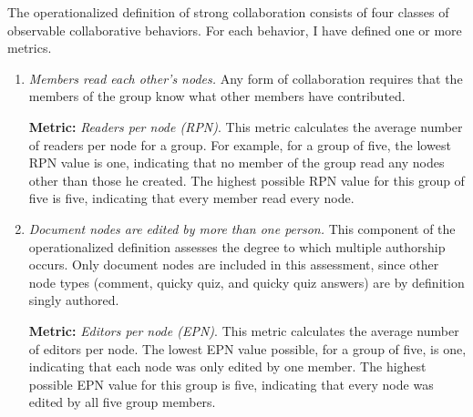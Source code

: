 The operationalized definition of strong collaboration consists of four
classes of observable collaborative behaviors.  For each behavior, I have
defined one or more metrics.

\begin{enumerate}
\item{\em Members read each other's nodes.}  Any form of collaboration
  requires that the members of the group know what other members have
  contributed. 
  
  
  {\bf Metric:} {\em Readers per node (RPN)}.  This metric calculates the
  average number of readers per node for a group. For example, for a
  group of five, the lowest RPN value is one, indicating that no member
  of the group read any nodes other than those he created.  The highest
  possible RPN value for this group of five is five, indicating that every member
  read every node.
  
  
  
%  

\item{\em Document nodes are edited by more than one person.}  This
  component of the operationalized definition assesses the degree to
  which multiple authorship occurs.  Only document nodes are included in
  this assessment, since other node types (comment, quicky quiz, and
  quicky quiz answers) are by definition singly authored.  

  {\bf Metric:} {\em Editors per node (EPN)}.  This metric calculates the
  average number of editors per node.  The lowest EPN value possible, for
  a group of five, is one, indicating that each node was only edited by
  one member.  The highest possible EPN value for this group is five,
  indicating that every node was edited by all five group members.


\end{enumerate}

